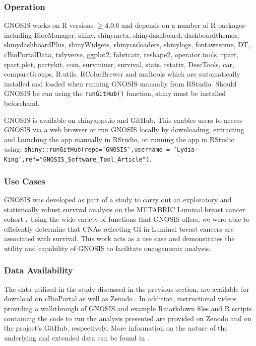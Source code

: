 \subsubsection{Operation}
\label{OP}
GNOSIS works on R versions $\geq 4.0.0$ and depends on a number of R packages including BiocManager, shiny, shinymeta, shinydashboard, dashboardthemes, shinydashboardPlus, shinyWidgets, shinycssloaders, shinylogs, fontawesome, DT, cBioPortalData, tidyverse, ggplot2, fabricatr, reshape2, operator.tools, rpart, rpart.plot, partykit, coin, survminer, survival, stats, rstatix, DescTools, car, compareGroups, R.utils, RColorBrewer and maftools \citep{hothorn_hornik_zeileis_2006, reshape2, coin, compareGroups, ctree1, ggplot2, operator.tools, maftools, tidyverse, car, shinycssloaders, cBioPortalData, survminer, shinymeta, shinydashboard, shinydashboardPlus, R.utils, shiny, rpart, fabricatr, shinylogs, rpart.plot, RColorBrewer, dashboardthemes, survival, BiocManager, shinyWidgets, fontawesome, DT, stats, rstatix, DescTools} which are automatically installed and loaded when running GNOSIS manually from RStudio. Should GNOSIS be run using the \texttt{runGitHub()} function, shiny must be installed beforehand. 

GNOSIS is available on shinyapps.io and GitHub. This enables users to access GNOSIS via a web browser or run GNOSIS locally by downloading, extracting and launching the app manually in RStudio, or running the app in RStudio using: \texttt{shiny::runGitHub(repo=‘GNOSIS’,username = ‘Lydia-King’,ref="GNOSIS\_Software\_Tool\_Article")}.

\subsubsection{Use Cases}
GNOSIS was developed as part of a study to carry out an exploratory and statistically robust survival analysis on the METABRIC Luminal breast cancer cohort \citep{King_2021}. Using the wide variety of functions that GNOSIS offers, we were able to efficiently determine that CNAs reflecting GI in Luminal breast cancers are associated with survival. This work acts as a use case and demonstrates the utility and capability of GNOSIS to facilitate oncogenomic analysis.  

\subsubsection{Data Availability}
The data utilised in the study discussed in the previous section, \cite{King_2021} are available for download on cBioPortal as well as Zenodo \citep{underlyingdata}. In addition, instructional videos providing a walkthrough of GNOSIS and example Rmarkdown files and R scripts containing the code to run the analysis presented are provided on Zenodo \citep{King_2022} and on the project’s GitHub, respectively. More information on the nature of the underlying and extended data can be found in \cite{King_GNOSIS}. 

